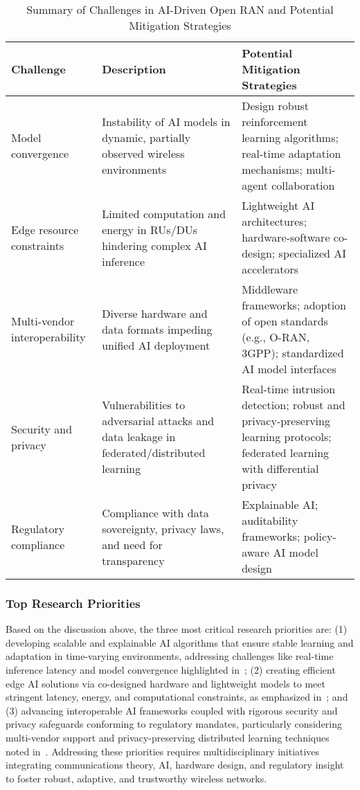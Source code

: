 \documentclass[sigconf]{acmart}
\begin{document}
\begin{table*}[htbp]
\centering
\caption{Summary of Challenges in AI-Driven Open RAN and Potential Mitigation Strategies}
\label{tab:challenges}
\begin{adjustbox}{max width=\textwidth}
\begin{tabular}{@{}lll@{}}
\toprule
\textbf{Challenge} & \textbf{Description} & \textbf{Potential Mitigation Strategies} \\ \midrule
Model convergence & Instability of AI models in dynamic, partially observed wireless environments~\cite{ref54} & Design robust reinforcement learning algorithms; real-time adaptation mechanisms; multi-agent collaboration \\[6pt]
Edge resource constraints & Limited computation and energy in RUs/DUs hindering complex AI inference~\cite{ref48,ref54} & Lightweight AI architectures; hardware-software co-design; specialized AI accelerators \\[6pt]
Multi-vendor interoperability & Diverse hardware and data formats impeding unified AI deployment~\cite{ref49,ref54} & Middleware frameworks; adoption of open standards (e.g., O-RAN, 3GPP); standardized AI model interfaces \\[6pt]
Security and privacy & Vulnerabilities to adversarial attacks and data leakage in federated/distributed learning~\cite{ref50,ref54} & Real-time intrusion detection; robust and privacy-preserving learning protocols; federated learning with differential privacy \\[6pt]
Regulatory compliance & Compliance with data sovereignty, privacy laws, and need for transparency~\cite{ref48,ref54} & Explainable AI; auditability frameworks; policy-aware AI model design \\ \bottomrule
\end{tabular}
\end{adjustbox}
\end{table*}

\subsubsection{Top Research Priorities}
Based on the discussion above, the three most critical research priorities are: (1) developing scalable and explainable AI algorithms that ensure stable learning and adaptation in time-varying environments, addressing challenges like real-time inference latency and model convergence highlighted in~\cite{ref48,ref54}; (2) creating efficient edge AI solutions via co-designed hardware and lightweight models to meet stringent latency, energy, and computational constraints, as emphasized in~\cite{ref49,ref54}; and (3) advancing interoperable AI frameworks coupled with rigorous security and privacy safeguards conforming to regulatory mandates, particularly considering multi-vendor support and privacy-preserving distributed learning techniques noted in~\cite{ref50,ref54}. Addressing these priorities requires multidisciplinary initiatives integrating communications theory, AI, hardware design, and regulatory insight to foster robust, adaptive, and trustworthy wireless networks.
\end{document}
